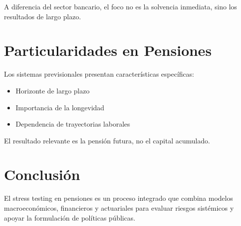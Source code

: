 \documentclass[11pt]{article}
\begin{document}
A diferencia del sector bancario, el foco no es la solvencia inmediata, sino los resultados de largo plazo.

\section{Particularidades en Pensiones}

Los sistemas previsionales presentan características específicas:

\begin{itemize}
\item Horizonte de largo plazo
\item Importancia de la longevidad
\item Dependencia de trayectorias laborales
\end{itemize}

El resultado relevante es la pensión futura, no el capital acumulado.

\section{Conclusión}

El stress testing en pensiones es un proceso integrado que combina modelos macroeconómicos, financieros y actuariales para evaluar riesgos sistémicos y apoyar la formulación de políticas públicas.
\end{document}
